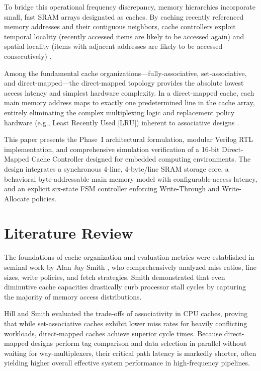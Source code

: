 \documentclass[conference]{IEEEtran}
\begin{document}
To bridge this operational frequency discrepancy, memory hierarchies incorporate small, fast SRAM arrays designated as caches. By caching recently referenced memory addresses and their contiguous neighbors, cache controllers exploit temporal locality (recently accessed items are likely to be accessed again) and spatial locality (items with adjacent addresses are likely to be accessed consecutively) \cite{smith1982cache}.

Among the fundamental cache organizations---fully-associative, set-associative, and direct-mapped---the direct-mapped topology provides the absolute lowest access latency and simplest hardware complexity. In a direct-mapped cache, each main memory address maps to exactly one predetermined line in the cache array, entirely eliminating the complex multiplexing logic and replacement policy hardware (e.g., Least Recently Used [LRU]) inherent to associative designs \cite{hill1989evaluating}.

This paper presents the Phase~I architectural formulation, modular Verilog RTL implementation, and comprehensive simulation verification of a 16-bit Direct-Mapped Cache Controller designed for embedded computing environments. The design integrates a synchronous 4-line, 4-byte/line SRAM storage core, a behavioral byte-addressable main memory model with configurable access latency, and an explicit six-state FSM controller enforcing Write-Through and Write-Allocate policies.

\section{Literature Review}
The foundations of cache organization and evaluation metrics were established in seminal work by Alan Jay Smith \cite{smith1982cache}, who comprehensively analyzed miss ratios, line sizes, write policies, and fetch strategies. Smith demonstrated that even diminutive cache capacities drastically curb processor stall cycles by capturing the majority of memory access distributions.

Hill and Smith \cite{hill1989evaluating} evaluated the trade-offs of associativity in CPU caches, proving that while set-associative caches exhibit lower miss rates for heavily conflicting workloads, direct-mapped caches achieve superior cycle times. Because direct-mapped designs perform tag comparison and data selection in parallel without waiting for way-multiplexers, their critical path latency is markedly shorter, often yielding higher overall effective system performance in high-frequency pipelines.
\end{document}
